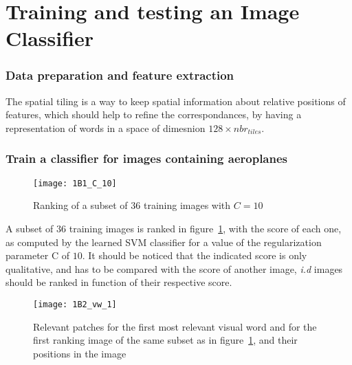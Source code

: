 \documentclass{article}
\begin{document}
\maketitle

\part{Training and testing an Image Classifier}

\section{Data preparation and feature extraction}



The spatial tiling is a way to keep spatial information about relative positions of features, which should help to refine the correspondances, by having a representation of words in a space of dimesnion \( 128 \times nbr_{tiles}\).

\section{Train a classifier for images containing aeroplanes}


\begin{figure}[ht!]
	\centering
	\texttt{[image: 1B1\_C\_10]}
	\caption{Ranking of a subset of 36 training images with \( C = 10\)}
	\label{fig_1B1}
\end{figure}
A subset of \(36\) training images is ranked in figure~\ref{fig_1B1}, with the score of each one, as computed by the learned SVM classifier for a value of the regularization parameter C of \(10\). It should be noticed that the indicated score is only qualitative, and has to be compared with the score of another image, \textit{i.d} images should be ranked in function of their respective score.

\clearpage
{}

\begin{figure}[ht!]
	\centering
	\texttt{[image: 1B2\_vw\_1]}
	\caption{Relevant patches for the first most relevant visual word and for the first ranking image of the same subset as in figure~\ref{fig_1B1}, and their positions in the image}
	\label{fig_1B2_vw_1}
\end{figure}
\end{document}
